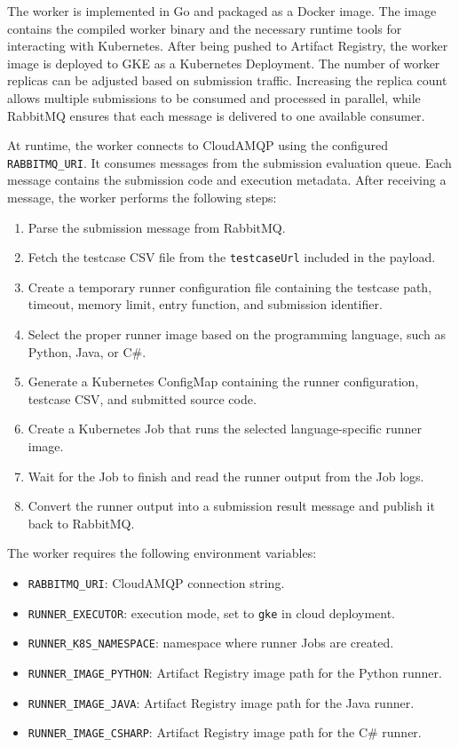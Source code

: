 The worker is implemented in Go and packaged as a Docker image. The image contains the compiled worker binary and the necessary runtime tools for interacting with Kubernetes. After being pushed to Artifact Registry, the worker image is deployed to GKE as a Kubernetes Deployment. The number of worker replicas can be adjusted based on submission traffic. Increasing the replica count allows multiple submissions to be consumed and processed in parallel, while RabbitMQ ensures that each message is delivered to one available consumer.

At runtime, the worker connects to CloudAMQP using the configured \texttt{RABBITMQ\_URI}. It consumes messages from the submission evaluation queue. Each message contains the submission code and execution metadata. After receiving a message, the worker performs the following steps:

\begin{enumerate}
    \item Parse the submission message from RabbitMQ.
    \item Fetch the testcase CSV file from the \texttt{testcaseUrl} included in the payload.
    \item Create a temporary runner configuration file containing the testcase path, timeout, memory limit, entry function, and submission identifier.
    \item Select the proper runner image based on the programming language, such as Python, Java, or C\#.
    \item Generate a Kubernetes ConfigMap containing the runner configuration, testcase CSV, and submitted source code.
    \item Create a Kubernetes Job that runs the selected language-specific runner image.
    \item Wait for the Job to finish and read the runner output from the Job logs.
    \item Convert the runner output into a submission result message and publish it back to RabbitMQ.
\end{enumerate}

The worker requires the following environment variables:

\begin{itemize}
    \item \texttt{RABBITMQ\_URI}: CloudAMQP connection string.
    \item \texttt{RUNNER\_EXECUTOR}: execution mode, set to \texttt{gke} in cloud deployment.
    \item \texttt{RUNNER\_K8S\_NAMESPACE}: namespace where runner Jobs are created.
    \item \texttt{RUNNER\_IMAGE\_PYTHON}: Artifact Registry image path for the Python runner.
    \item \texttt{RUNNER\_IMAGE\_JAVA}: Artifact Registry image path for the Java runner.
    \item \texttt{RUNNER\_IMAGE\_CSHARP}: Artifact Registry image path for the C\# runner.
\end{itemize}

